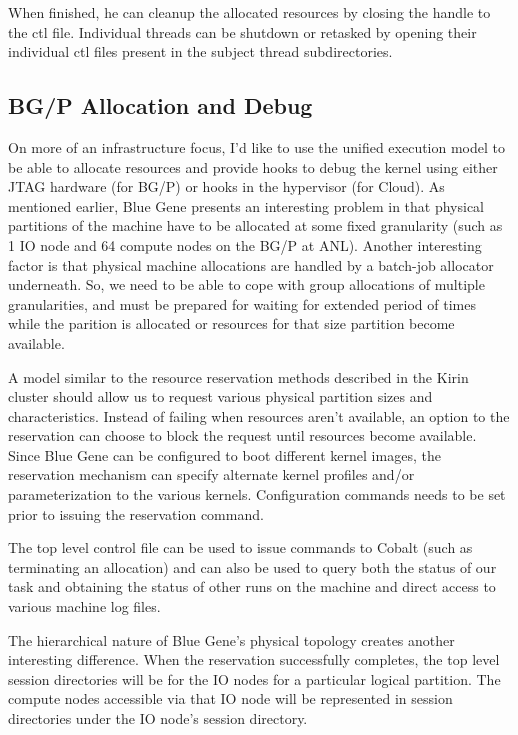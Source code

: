 \documentclass{sig-alternate}
\begin{document}
When finished, he can cleanup the allocated resources by closing the handle
to the ctl file.  Individual threads can be shutdown or retasked by opening
their individual ctl files present in the subject thread subdirectories.
  
\subsection*{BG/P Allocation and Debug}

On more of an infrastructure focus, I'd like to use the unified execution
model to be able to allocate resources and provide hooks to debug the 
kernel using either JTAG hardware (for BG/P) or hooks in the hypervisor (for
Cloud).  As mentioned earlier, Blue Gene presents an interesting problem
in that physical partitions of the machine have to be allocated at some fixed
granularity (such as 1 IO node and 64 compute nodes on the BG/P at ANL).
Another interesting factor is that physical machine allocations are handled
by a batch-job allocator underneath.
So, we need to be able to cope with group allocations of multiple granularities,
and must be prepared for waiting for extended period of times while the
parition is allocated or resources for that size partition become available.

A model similar to the resource reservation methods described in the Kirin
cluster should allow us to request various physical partition sizes and
characteristics.  Instead of failing when resources aren't available, an
option to the reservation can choose to block the request until resources
become available.  Since Blue Gene can be configured to boot different
kernel images, the reservation mechanism can specify alternate kernel 
profiles and/or parameterization to the various kernels.  Configuration
commands needs to be set prior to issuing the reservation command.

The top level control file can be used to issue commands to Cobalt
(such as terminating an allocation) and can also be used to query both
the status of our task and obtaining the status of other runs on the
machine and direct access to various machine log files.

The hierarchical nature of Blue Gene's physical topology creates another
interesting difference.  When the reservation successfully completes, the
top level session directories will be for the IO nodes for a particular
logical partition.   The compute nodes accessible via that IO node will be
represented in session directories under the IO node's session directory.
\end{document}
